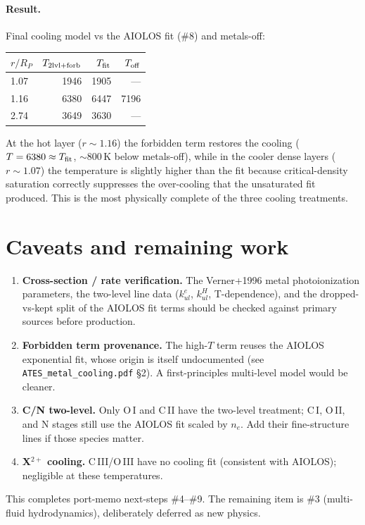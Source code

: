\documentclass[english,a4paper]{my_memo}
\begin{document}
\paragraph{Result.}  Final cooling model vs the AIOLOS fit (\#8) and
metals-off:
\begin{center}
\begin{tabular}{lrrr}
\toprule
$r/R_P$ & $T_{\rm 2lvl+forb}$ & $T_{\rm fit}$ & $T_{\rm off}$ \\
\midrule
1.07 & 1946 & 1905 & --- \\
1.16 & 6380 & 6447 & 7196 \\
2.74 & 3649 & 3630 & --- \\
\bottomrule
\end{tabular}
\end{center}
At the hot layer ($r\sim1.16$) the forbidden term restores the cooling
($T = 6380 \approx T_{\rm fit}$, $\sim 800$\,K below metals-off), while in
the cooler dense layers ($r\sim1.07$) the temperature is slightly higher
than the fit because critical-density saturation correctly suppresses the
over-cooling that the unsaturated fit produced. This is the most
physically complete of the three cooling treatments.

\section{Caveats and remaining work}

\begin{enumerate}
\item \textbf{Cross-section / rate verification.} The Verner+1996 metal
  photoionization parameters, the two-level line data ($k^e_{ul}$,
  $k^H_{ul}$, T-dependence), and the dropped-vs-kept split of the AIOLOS
  fit terms should be checked against primary sources before production.
\item \textbf{Forbidden term provenance.} The high-$T$ term reuses the
  AIOLOS exponential fit, whose origin is itself undocumented (see
  \texttt{ATES\_metal\_cooling.pdf} \S2). A first-principles multi-level
  model would be cleaner.
\item \textbf{C/N two-level.} Only O\,I and C\,II have the two-level
  treatment; C\,I, O\,II, and N stages still use the AIOLOS fit scaled by
  $n_e$.  Add their fine-structure lines if those species matter.
\item \textbf{X$^{2+}$ cooling.} C\,III/O\,III have no cooling fit
  (consistent with AIOLOS); negligible at these temperatures.
\end{enumerate}

This completes port-memo next-steps \#4--\#9. The remaining item is
\#3 (multi-fluid hydrodynamics), deliberately deferred as new physics.
\end{document}
